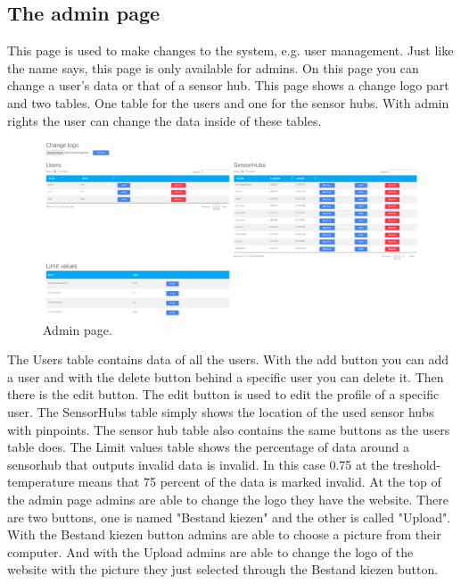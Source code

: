 \documentclass[a4paper]{article}
\begin{document}
\subsection{The admin page}
This page is used to make changes to the system, e.g. user management. Just like the name says, this page is only available for admins. On this page you can change a user's data or that of a sensor hub.
\newline
\newline
This page shows a change logo part and two tables. One table for the users and one for the sensor hubs. With admin rights the user can change the data inside of these tables.
\begin{figure}[h!]
  \caption{Admin page.}
  \centering
  \includegraphics[width=1\textwidth]{admin}
\end{figure}
\newline
\newline
The Users table contains data of all the users. With the add button you can add a user and with the delete button behind a specific user you can delete it. Then there is the edit button. The edit button is used to edit the profile of a specific user.
\newline
\newline
The SensorHubs table simply shows the location of the used sensor hubs with pinpoints. The sensor hub table also contains the same buttons as the users table does.
\newline
\newline
The Limit values table shows the percentage of data around a sensorhub that outputs invalid data is invalid.
\newline
In this case 0.75 at the treshold-temperature means that 75 percent of the data is marked invalid.
\newline
\newline
At the top of the admin page admins are able to change the logo they have the website. There are two buttons, one is named "Bestand kiezen" and the other is called "Upload". With the Bestand kiezen button admins are able to choose a picture from their computer. And with the Upload admins are able to change the logo of the website with the picture they just selected through the Bestand kiezen button.
\newline
\end{document}
